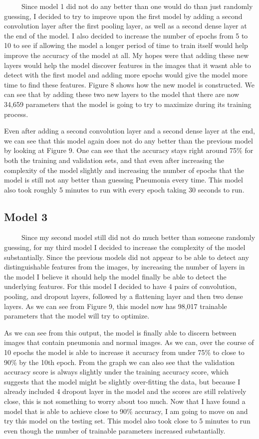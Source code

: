 \documentclass[12pt]{article}
\begin{document}
~~~~~Since model 1 did not do any better than one would do than just
randomly guessing, I decided to try to improve upon the first model by
adding a second convolution layer after the first pooling layer, as well
as a second dense layer at the end of the model. I also decided to
increase the number of epochs from 5 to 10 to see if allowing the model
a longer period of time to train itself would help improve the accuracy
of the model at all. My hopes were that adding these new layers would
help the model discover features in the images that it wasnt able to
detect with the first model and adding more epochs would give the model
more time to find these features. Figure 8 shows how the new model is
constructed. We can see that by adding these two new layers to the model
that there are now 34,659 parameters that the model is going to try to
maximize during its training process.

Even after adding a second convolution layer and a second dense layer at
the end, we can see that this model again does not do any better than
the previous model by looking at Figure 9. One can see that the accuracy
stays right around 75\% for both the training and validation sets, and
that even after increasing the complexity of the model slightly and
increasing the number of epochs that the model is still not any better
than guessing Pneumonia every time. This model also took roughly 5
minutes to run with every epoch taking 30 seconds to run.

\hypertarget{model-3}{%
\subsection{Model 3}\label{model-3}}

~~~~~Since my second model still did not do much better than someone
randomly guessing, for my third model I decided to increase the
complexity of the model substantially. Since the previous models did not
appear to be able to detect any distinguishable features from the
images, by increasing the number of layers in the model I believe it
should help the model finally be able to detect the underlying features.
For this model I decided to have 4 pairs of convolution, pooling, and
dropout layers, followed by a flattening layer and then two dense
layers. As we can see from Figure 9, this model now has 98,017 trainable
parameters that the model will try to optimize.

As we can see from this output, the model is finally able to discern
between images that contain pneumonia and normal images. As we can, over
the course of 10 epochs the model is able to increase it accuracy from
under 75\% to close to 90\% by the 10th epoch. From the graph we can
also see that the validation accuracy score is always slightly under the
training accuracy score, which suggests that the model might be slightly
over-fitting the data, but because I already included 4 dropout layer in
the model and the scores are still relatively close, this is not
something to worry about too much. Now that I have found a model that is
able to achieve close to 90\% accuracy, I am going to move on and try
this model on the testing set. This model also took close to 5 minutes
to run even though the number of trainable parameters increased
substantially.
\end{document}
